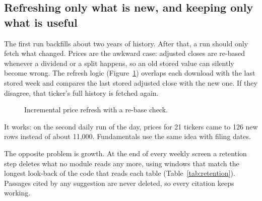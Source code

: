 \documentclass[11pt,a4paper]{article}
\begin{document}
\subsection{Refreshing only what is new, and keeping only what is useful}

The first run backfills about two years of history. After that, a run should only fetch what changed.
Prices are the awkward case: adjusted closes are re-based whenever a dividend or a split happens, so an
old stored value can silently become wrong. The refresh logic (Figure~\ref{fig:refresh}) overlaps each
download with the last stored week and compares the last stored adjusted close with the new one. If
they disagree, that ticker's full history is fetched again.

\begin{figure}[htbp]
\centering
{}
\caption{Incremental price refresh with a re-base check.}
\label{fig:refresh}
\end{figure}

It works: on the second daily run of the day, prices for 21 tickers came to 126 new rows instead of
about 11,000. Fundamentals use the same idea with filing dates.

The opposite problem is growth. At the end of every weekly screen a retention step deletes what no module
reads any more, using windows that match the longest look-back of the code that reads each table
(Table~\ref{tab:retention}). Passages cited by any suggestion are never deleted, so every citation keeps
working.
\end{document}
